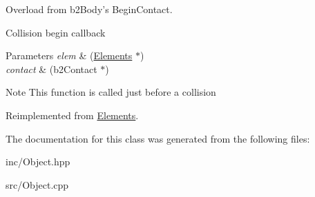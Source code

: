 Overload from b2\+Body's Begin\+Contact. 

Collision begin callback 
\begin{DoxyParams}{Parameters}
{\em elem} & (\hyperlink{class_elements}{Elements} $\ast$) \\
\hline
{\em contact} & (b2\+Contact $\ast$) \\
\hline
\end{DoxyParams}
\begin{DoxyNote}{Note}
This function is called just before a collision 
\end{DoxyNote}


Reimplemented from \hyperlink{class_elements}{Elements}.



The documentation for this class was generated from the following files\+:\begin{DoxyCompactItemize}
\item 
inc/Object.\+hpp\item 
src/Object.\+cpp\end{DoxyCompactItemize}
